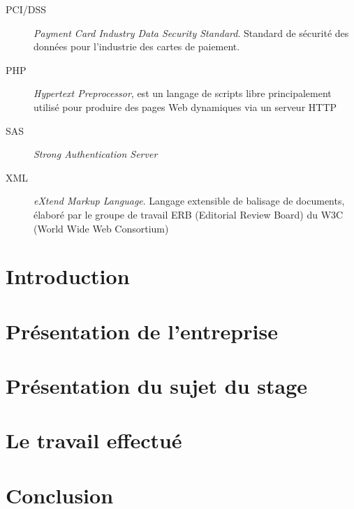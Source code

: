 \documentclass[a4paper,french,12pt]{report}
\begin{document}
\begin{description}
	\item[PCI/DSS]  \textsl{Payment Card Industry Data Security Standard}. Standard de sécurité des données pour l’industrie des cartes de paiement.
        \item[PHP]  \textsl{Hypertext Preprocessor}, est un langage de scripts libre principalement utilisé pour produire des pages Web dynamiques via un serveur HTTP
        \item[SAS] \textsl{Strong Authentication Server}
        \item[XML] \textsl{eXtend Markup Language}. Langage extensible de balisage de documents, élaboré par le groupe de travail ERB (Editorial Review Board) du W3C (World Wide Web Consortium)







\end{description}


\chapter{Introduction}


\chapter{Présentation de l'entreprise}


\chapter{Présentation du sujet du stage}


\chapter{Le travail effectué}


\chapter{Conclusion}

\end{document}
